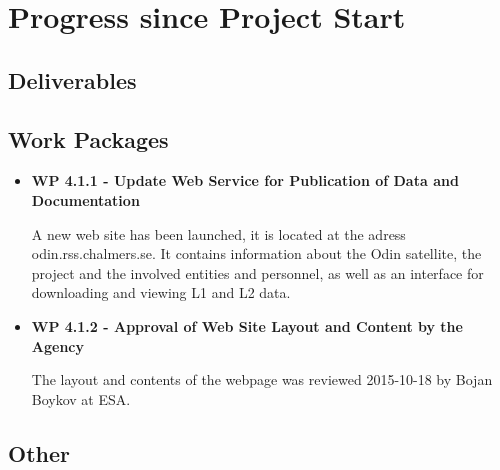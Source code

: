 \chapter{Progress since Project Start}
\label{chapter:progress}

\section{Deliverables}

\section{Work Packages}

\begin{itemize}

\item {\bf WP 4.1.1 - Update Web Service for Publication of Data and Documentation}

A new web site has been launched, it is located at the adress odin.rss.chalmers.se. It contains information about the Odin satellite, the project and the involved entities and personnel, as well as an interface for downloading and viewing L1 and L2 data.   

\item {\bf WP 4.1.2 - Approval of Web Site Layout and Content by the Agency}

The layout and contents of the webpage was reviewed 2015-10-18 by Bojan Boykov at ESA. 

\end{itemize}

\section{Other}

